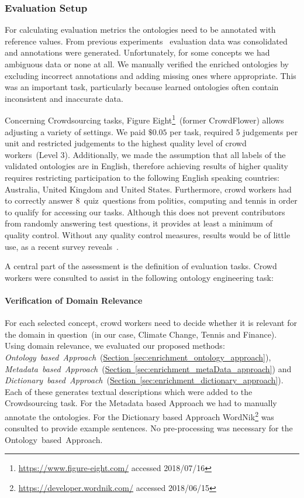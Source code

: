 \subsubsection{Evaluation Setup}
For calculating evaluation metrics the ontologies need to be annotated with reference values. From previous experiments~\cite{wohlgenannt2016} evaluation data was consolidated and annotations were generated. Unfortunately, for some concepts we had ambiguous data or none at all. We manually verified the enriched ontologies by excluding incorrect annotations and adding missing ones where appropriate. This was an important task, particularly because learned ontologies often contain inconsistent and inaccurate data. 

Concerning Crowdsourcing tasks, Figure Eight\footnote{\url{https://www.figure-eight.com/} accessed 2018/07/16}~(former CrowdFlower) allows adjusting a variety of settings. We paid $\$0.05$ per task, required 5 judgements per unit and restricted judgements to the highest quality level of crowd workers~(Level 3). Additionally, we made the assumption that all labels of the validated ontologies are in English, therefore achieving results of higher quality requires restricting participation to the following English speaking countries: Australia, United Kingdom and United States. Furthermore, crowd workers had to correctly answer 8~quiz~questions from politics, computing and tennis in order to qualify for accessing our tasks. Although this does not prevent contributors from randomly answering test questions, it provides at least a minimum of quality control. Without any quality control measures, results would be of little use, as a recent survey reveals~\cite{daniel2018}. 

A central part of the assessment is the definition of evaluation tasks. Crowd workers were consulted to assist in the following ontology engineering task: 

\paragraph{Verification of Domain Relevance} For each selected concept, crowd workers need to decide whether it is relevant for the domain in question~(in our case, Climate Change, Tennis and Finance).
Using domain relevance, we evaluated our proposed methods:
\emph{Ontology~based~Approach}~(\hyperref[sec:enrichment_ontology_approach]{Section~\ref*{sec:enrichment_ontology_approach}}),
\emph{Metadata~based~Approach}~(\hyperref[sec:enrichment_metaData_approach]{Section~\ref*{sec:enrichment_metaData_approach}}) and
\emph{Dictionary~based~Approach}~(\hyperref[sec:enrichment_dictionary_approach]{Section~\ref*{sec:enrichment_dictionary_approach}}).
Each of these generates textual descriptions which were added to the Crowdsourcing task. For the Metadata based Approach we had to manually annotate the ontologies. For the Dictionary based Approach WordNik\footnote{\url{https://developer.wordnik.com/} accessed 2018/06/15} was consulted to provide example sentences. No pre-processing was necessary for the Ontology~based~Approach. 

